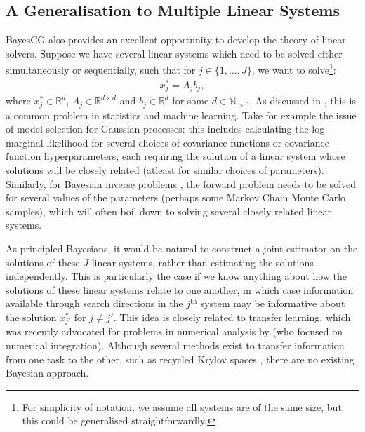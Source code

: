 \documentclass[twoside]{article}
\begin{document}






\subsection*{A Generalisation to Multiple Linear Systems}

BayesCG also provides an excellent opportunity to develop the theory of linear solvers. Suppose we have several linear systems which need to be solved either simultaneously or sequentially, such that for $j \in \{1,\ldots,J\}$, we want to solve\footnote{For simplicity of notation, we assume all systems are of the same size, but this could be generalised straightforwardly.}:
\begin{align*}
x_j^* = A_j b_j,  
\end{align*}
where $x_j^* \in \mathbb{R}^d$, $A_j \in \mathbb{R}^{d \times d}$ and $b_j \in \mathbb{R}^d$ for some $d \in \mathbb{N}_{> 0}$. As discussed in 
\cite{DeRoos2017}, this is a common problem in statistics and machine learning. Take for example the issue of model selection for Gaussian processes: this includes calculating the log-marginal likelihood for several choices of covariance functions or covariance function hyperparameters, each requiring the solution of a linear system whose solutions will be closely related (atleast for similar choices of parameters). Similarly, for Bayesian inverse problems \citep{Dashti2017}, the forward problem needs to be solved for several values of the parameters (perhaps some Markov Chain Monte Carlo samples), which will often boil down to solving several closely related linear systems.

As principled Bayesians, it would be natural to construct a joint estimator on the solutions of these $J$ linear systems, rather than estimating the solutions independently. This is particularly the case if we know anything about how the solutions of these linear systems relate to one another, in which case information available through search directions in the $j^{\text{th}}$ system may be informative about the solution $x^*_{j'}$ for $j \neq j'$. This idea is closely related to transfer learning, which was recently advocated for problems in numerical analysis by \cite{Xi2018MultiOutput} (who focused on numerical integration). Although several methods exist to transfer information from one task to the other, such as recycled Krylov spaces \citep{DeRoos2017}, there are no existing Bayesian approach. 
\end{document}
